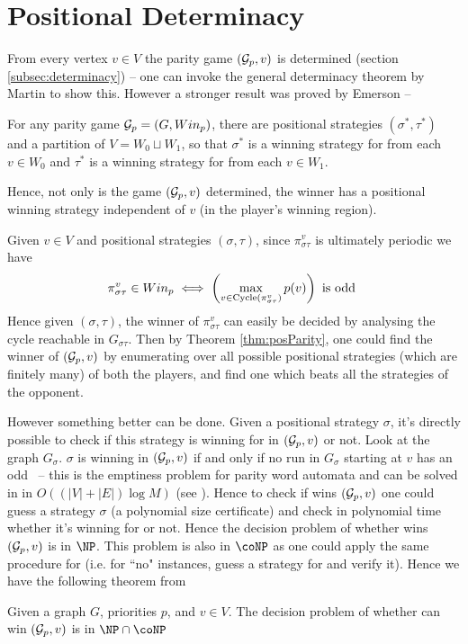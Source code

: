 \section{Positional Determinacy}
From every vertex $v \in V$ the parity game $(\mathcal{G}_p,v)$ is determined (section \ref{subsec:determinacy}) -- one can invoke the general determinacy theorem by Martin \cite{martin_borel_1975}  to show this. However a stronger result was proved by Emerson \cite{emerson_automata_1985} --\\


\begin{theorem}
    \label{thm:posParity}
    For any parity game $\mathcal{G}_p=(G,Win_p)$, there are positional strategies $(\sigma^*,\tau^*)$ and a partition of $V = W_0 \sqcup W_1$, so that $\sigma^*$ is a winning strategy for  from each $v \in W_0$ and $\tau^*$ is a winning strategy for  from each $v \in W_1$.
\end{theorem}
Hence, not only is the game $(\mathcal{G}_p,v)$ determined, the winner has a positional winning strategy independent of $v$ (in the player's winning region).

Given $v \in V$ and positional strategies $(\sigma,\tau)$, since $\pi^{v}_{\sigma\tau}$ is ultimately periodic we have 
\[
    \pi^{v}_{\sigma\tau} \in Win_p \iff \left( \max_{v \in \operatorname{Cycle}(\pi^v_{\sigma\tau})} p(v)\right) \text{ is odd }
\]
Hence given $(\sigma,\tau)$, the winner of $\pi^v_{\sigma\tau}$ can easily be decided by analysing the cycle reachable in $G_{\sigma\tau}$.  Then by Theorem \ref{thm:posParity}, one could find the winner of $(\mathcal{G}_p,v)$ by enumerating over all possible positional strategies (which are finitely many) of both the players, and find one which beats all the strategies of the opponent. 

However something better can be done. Given a positional strategy $\sigma$, it's directly possible to check if this strategy is winning for  in $(\mathcal{G}_p,v)$ or not. Look at the graph $G_\sigma$. $\sigma$ is winning in $(\mathcal{G}_p,v)$ if and only if no run in $G_\sigma$ starting at $v$ has an odd \mip\ -- this is the emptiness problem for parity word automata and can be solved in in $O\left((|V|+|E|) \log M\right)$ (see \cite{king_complexity_2001}). Hence to check if  wins $(\mathcal{G}_p,v)$ one could guess a strategy $\sigma$ (a polynomial size certificate) and check in polynomial time whether it's winning for  or not. Hence the decision problem of whether  wins $(\mathcal{G}_p,v)$ is in $\NP$. This problem is also in $\coNP$ as one could apply the same procedure for  (i.e. for ``no" instances, guess a strategy for  and verify it). Hence we have the following theorem from \cite{thomas2002automata}\\
\begin{theorem}
    Given a graph $G$, priorities $p$, and $v \in V$. The decision problem of whether  can win $(\mathcal{G}_p,v)$ is in $\NP \cap \coNP$
\end{theorem}

